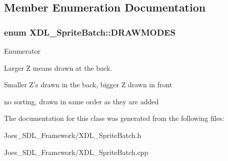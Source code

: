 \subsection{Member Enumeration Documentation}
\hypertarget{class_x_d_l___sprite_batch_a0dba0557842cdf21917adc2ef44125e6}{
\subsubsection[{D\-R\-A\-W\-M\-O\-D\-E\-S}]{\setlength{\rightskip}{0pt plus 5cm}enum {\bf X\-D\-L\-\_\-\-Sprite\-Batch\-::\-D\-R\-A\-W\-M\-O\-D\-E\-S}}}\label{class_x_d_l___sprite_batch_a0dba0557842cdf21917adc2ef44125e6}
\begin{Desc}
\item[Enumerator]\par
\begin{description}
\item[{\em 
\hypertarget{class_x_d_l___sprite_batch_a0dba0557842cdf21917adc2ef44125e6af0aff02dad6d665eb8a61c108e5ca1d1}{B\-A\-C\-K\-T\-O\-F\-R\-O\-N\-T}\label{class_x_d_l___sprite_batch_a0dba0557842cdf21917adc2ef44125e6af0aff02dad6d665eb8a61c108e5ca1d1}
}]Larger Z means drawn at the back. \item[{\em 
\hypertarget{class_x_d_l___sprite_batch_a0dba0557842cdf21917adc2ef44125e6a4dea32cd64020138077648d29c34f58a}{U\-N\-S\-O\-R\-T\-E\-D}\label{class_x_d_l___sprite_batch_a0dba0557842cdf21917adc2ef44125e6a4dea32cd64020138077648d29c34f58a}
}]Smaller Z's drawn in the back, bigger Z drawn in front

no sorting, drawn in same order as they are added \end{description}
\end{Desc}


The documentation for this class was generated from the following files\-:\begin{DoxyCompactItemize}
\item 
Joes\-\_\-\-S\-D\-L\-\_\-\-Framework/X\-D\-L\-\_\-\-Sprite\-Batch.\-h\item 
Joes\-\_\-\-S\-D\-L\-\_\-\-Framework/X\-D\-L\-\_\-\-Sprite\-Batch.\-cpp\end{DoxyCompactItemize}
